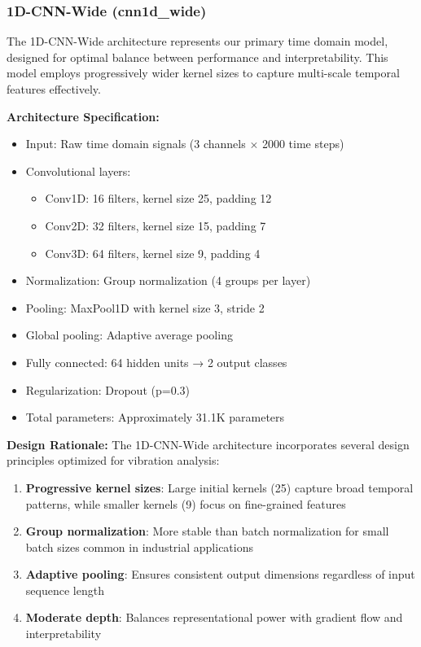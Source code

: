 \documentclass[12pt]{article}
\begin{document}
\subsubsection{1D-CNN-Wide (cnn1d\_wide)}

The 1D-CNN-Wide architecture represents our primary time domain model, designed for optimal balance between performance and interpretability. This model employs progressively wider kernel sizes to capture multi-scale temporal features effectively.

\textbf{Architecture Specification:}
\begin{itemize}
    \item Input: Raw time domain signals (3 channels $\times$ 2000 time steps)
    \item Convolutional layers:
    \begin{itemize}
        \item Conv1D: 16 filters, kernel size 25, padding 12
        \item Conv2D: 32 filters, kernel size 15, padding 7  
        \item Conv3D: 64 filters, kernel size 9, padding 4
    \end{itemize}
    \item Normalization: Group normalization (4 groups per layer)
    \item Pooling: MaxPool1D with kernel size 3, stride 2
    \item Global pooling: Adaptive average pooling
    \item Fully connected: 64 hidden units → 2 output classes
    \item Regularization: Dropout (p=0.3)
    \item Total parameters: Approximately 31.1K parameters
\end{itemize}

\textbf{Design Rationale:}
The 1D-CNN-Wide architecture incorporates several design principles optimized for vibration analysis:

\begin{enumerate}
    \item \textbf{Progressive kernel sizes}: Large initial kernels (25) capture broad temporal patterns, while smaller kernels (9) focus on fine-grained features
    \item \textbf{Group normalization}: More stable than batch normalization for small batch sizes common in industrial applications
    \item \textbf{Adaptive pooling}: Ensures consistent output dimensions regardless of input sequence length
    \item \textbf{Moderate depth}: Balances representational power with gradient flow and interpretability
\end{enumerate}
\end{document}
